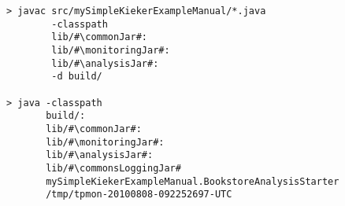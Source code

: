 \begin{lstlisting}[caption=Compile and run under Linux] 			
> javac src/mySimpleKiekerExampleManual/*.java
        -classpath	
        lib/#\commonJar#:
        lib/#\monitoringJar#:
        lib/#\analysisJar#:
        -d build/

> java -classpath
       build/:
       lib/#\commonJar#:
       lib/#\monitoringJar#:
       lib/#\analysisJar#:
       lib/#\commonsLoggingJar#
       mySimpleKiekerExampleManual.BookstoreAnalysisStarter 
       /tmp/tpmon-20100808-092252697-UTC
\end{lstlisting}	
